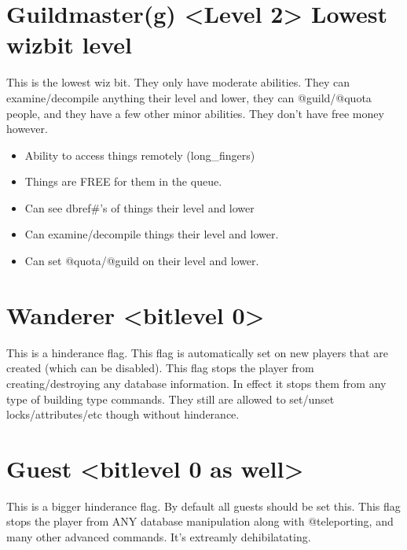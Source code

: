 \documentclass[letterpaper,10pt,english]{sphinxmanual}
\begin{document}
\section{Guildmaster(g) \textless{}Level 2\textgreater{} \sphinxhyphen{} Lowest wizbit level}
\label{\detokenize{bitlevels:guildmaster-g-level-2-lowest-wizbit-level}}
\sphinxAtStartPar
This is the lowest wiz bit.  They only have moderate abilities.
They can examine/decompile anything their level and lower, they can
@guild/@quota people, and they have a few other minor abilities.
They don’t have free money however.
\begin{itemize}
\item {} 
\sphinxAtStartPar
Ability to access things remotely (long\_fingers)

\item {} 
\sphinxAtStartPar
Things are FREE for them in the queue.

\item {} 
\sphinxAtStartPar
Can see dbref\#’s of things their level and lower

\item {} 
\sphinxAtStartPar
Can examine/decompile things their level and lower.

\item {} 
\sphinxAtStartPar
Can set @quota/@guild on their level and lower.

\end{itemize}


\section{Wanderer \textless{}bitlevel 0\textgreater{}}
\label{\detokenize{bitlevels:wanderer-bitlevel-0}}
\sphinxAtStartPar
This is a hinderance flag.  This flag is automatically set on new
players that are created (which can be disabled).  This flag stops
the player from creating/destroying any database information.   In
effect it stops them from any type of building type commands.  They
still are allowed to set/unset locks/attributes/etc though without
hinderance.


\section{Guest \textless{}bitlevel 0 as well\textgreater{}}
\label{\detokenize{bitlevels:guest-bitlevel-0-as-well}}
\sphinxAtStartPar
This is a bigger hinderance flag.  By default all guests should be
set this.  This flag stops the player from ANY database manipulation
along with @teleporting, and many other advanced commands.  It’s
extreamly dehibilatating.
\end{document}
